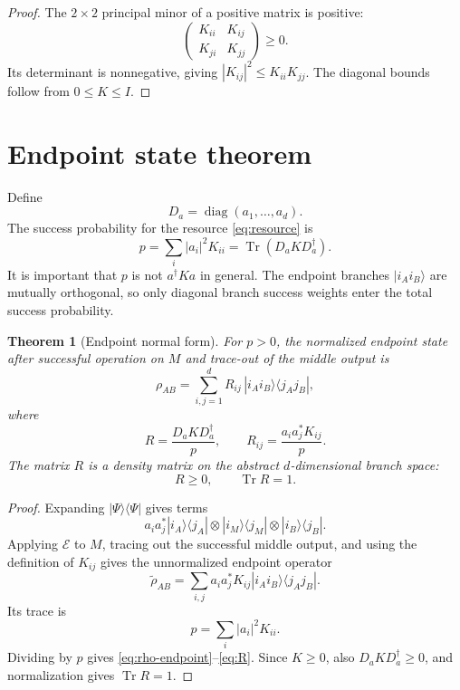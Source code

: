 \documentclass[reprint,aps,pra,superscriptaddress,nofootinbib,longbibliography]{revtex4-2}
\newtheorem{theorem}{Theorem}
\newcommand{\ket}[1]{|#1\rangle}
\newcommand{\bra}[1]{\langle #1|}
\newcommand{\Tr}{\operatorname{Tr}}
\newcommand{\EE}{\mathcal E}
\newcommand{\diag}{\operatorname{diag}}
\begin{document}
\begin{proof}
The \(2\times2\) principal minor of a positive matrix is positive:
\[
\begin{pmatrix}
K_{ii}&K_{ij}\\
K_{ji}&K_{jj}
\end{pmatrix}\ge0.
\]
Its determinant is nonnegative, giving \(|K_{ij}|^2\le K_{ii}K_{jj}\).  The diagonal bounds follow from \(0\le K\le I\).
\end{proof}

\section{Endpoint state theorem}
\label{sec:endpoint}

Define
\begin{equation}
D_a=\diag(a_1,\ldots,a_d).
\label{eq:Da}
\end{equation}
The success probability for the resource \eqref{eq:resource} is
\begin{equation}
p
=
\sum_i |a_i|^2K_{ii}
=
\Tr(D_aKD_a^\dagger).
\label{eq:p-correct}
\end{equation}
It is important that \(p\) is not \(a^\dagger Ka\) in general.  The endpoint branches \(\ket{i_Ai_B}\) are mutually orthogonal, so only diagonal branch success weights enter the total success probability.

\begin{theorem}[Endpoint normal form]
For \(p>0\), the normalized endpoint state after successful operation on \(M\) and trace-out of the middle output is
\begin{equation}
\rho_{AB}
=
\sum_{i,j=1}^d
R_{ij}\,
\ket{i_Ai_B}\bra{j_Aj_B},
\label{eq:rho-endpoint}
\end{equation}
where
\begin{equation}
R
=
\frac{D_aKD_a^\dagger}{p},
\qquad
R_{ij}
=
\frac{a_i a_j^*K_{ij}}{p}.
\label{eq:R}
\end{equation}
The matrix \(R\) is a density matrix on the abstract \(d\)-dimensional branch space:
\begin{equation}
R\ge0,\qquad \Tr R=1.
\end{equation}
\end{theorem}

\begin{proof}
Expanding \(\ket{\Psi}\bra{\Psi}\) gives terms
\[
a_i a_j^*
\ket{i_A}\bra{j_A}
\otimes
\ket{i_M}\bra{j_M}
\otimes
\ket{i_B}\bra{j_B}.
\]
Applying \(\EE\) to \(M\), tracing out the successful middle output, and using the definition of \(K_{ij}\) gives the unnormalized endpoint operator
\[
\widetilde\rho_{AB}
=
\sum_{i,j}
a_i a_j^*K_{ij}
\ket{i_Ai_B}\bra{j_Aj_B}.
\]
Its trace is
\[
p=\sum_i |a_i|^2K_{ii}.
\]
Dividing by \(p\) gives \eqref{eq:rho-endpoint}--\eqref{eq:R}.  Since \(K\ge0\), also \(D_aKD_a^\dagger\ge0\), and normalization gives \(\Tr R=1\).
\end{proof}
\end{document}
